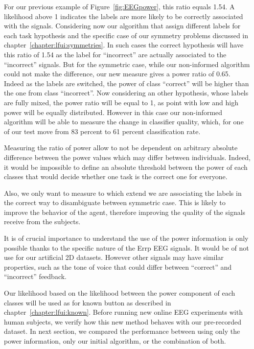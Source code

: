 For our previous example of Figure~\ref{fig:EEGpower}, this ratio equals 1.54. A likelihood above 1 indicates the labels are more likely to be correctly associated with the signals. Considering now our algorithm that assign different labels for each task hypothesis and the specific case of our symmetry problems discussed in chapter~\ref{chapter:lfui:symmetries}. In such cases the correct hypothesis will have this ratio of 1.54 as the label for ``incorrect'' are actually associated to the ``incorrect'' signals. But for the symmetric case, while our non-informed algorithm could not make the difference, our new measure gives a power ratio of 0.65. Indeed as the labels are switched, the power of class ``correct'' will be higher than the one from class ``incorrect''. Now considering an other hypothesis, whose labels are fully mixed, the power ratio will be equal to 1, as point with low and high power will be equally distributed. However in this case our non-informed algorithm will be able to measure the change in classifier quality, which, for one of our test move from 83 percent to 61 percent classification rate.

Measuring the ratio of power allow to not be dependent on arbitrary absolute difference between the power values which may differ between individuals. Indeed, it would be impossible to define an absolute threshold between the power of each classes that would decide whether one task is the correct one for everyone. 

Also, we only want to measure to which extend we are associating the labels in the correct way to disambiguate between symmetric case. This is likely to improve the behavior of the agent, therefore improving the quality of the signals receive from the subjects. 

It is of crucial importance to understand the use of the power information is only possible thanks to the specific nature of the Errp EEG signals. It would be of not use for our artificial 2D datasets. However other signals may have similar properties, such as the tone of voice that could differ between ``correct'' and ``incorrect'' feedback.

Our likelihood based on the likelihood between the power component of each classes will be used as for known button as described in chapter~\ref{chapter:lfui:known}. Before running new online EEG experiments with human subjects, we verify how this new method behaves with our pre-recorded dataset. In next section, we compared the performance between using only the power information, only our initial algorithm, or the combination of both.

